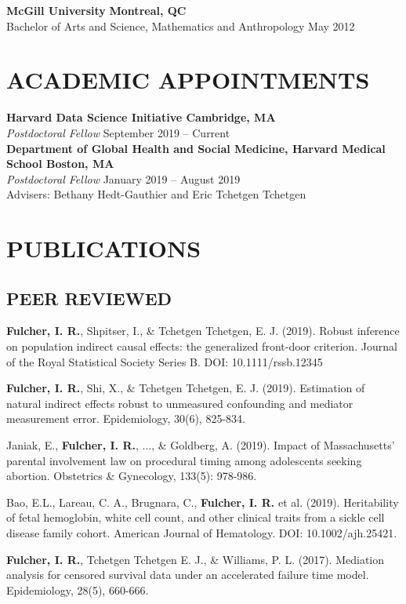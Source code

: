 \documentclass[12pt]{article}
\begin{document}
\textbf{McGill University} \hfill \hfill \textbf{Montreal, QC} \\
Bachelor of Arts and Science, Mathematics and Anthropology  \hfill \hfill May 2012 


\section*{\textbf{{\large A}CADEMIC {\large A}PPOINTMENTS }}

\textbf{Harvard Data Science Initiative \hfill \hfill Cambridge, MA} \\
\textit{Postdoctoral Fellow}  \hfill \hfill September 2019 -- Current \\

\textbf{Department of Global Health and Social Medicine, Harvard Medical School \hfill \hfill Boston, MA} \\
\textit{Postdoctoral Fellow} \hfill \hfill January 2019 -- August 2019 \\
Advisers: Bethany Hedt-Gauthier and Eric Tchetgen Tchetgen 

\section*{\textbf{{\large P}{UBLICATIONS}}}

\subsection*{\textbf{PEER REVIEWED}}

\begin{etaremune}
	\item \textbf{Fulcher, I. R.}, Shpitser, I., \& Tchetgen Tchetgen, E. J. (2019). Robust inference on population indirect causal effects: the generalized front-door criterion. Journal of the Royal Statistical Society Series B. DOI: 10.1111/rssb.12345
	
	\item \textbf{Fulcher, I. R.}, Shi, X., \& Tchetgen Tchetgen, E. J. (2019). Estimation of natural indirect effects robust to unmeasured confounding and mediator measurement error. Epidemiology, 30(6), 825-834.
	
	\item Janiak, E., \textbf{Fulcher, I. R.}, ..., \& Goldberg, A. (2019). Impact of Massachusetts' parental involvement law on procedural timing among adolescents seeking abortion. Obstetrics \& Gynecology, 133(5): 978-986.
	
	\item Bao, E.L., Lareau, C. A., Brugnara, C., \textbf{Fulcher, I. R.} et al. (2019). Heritability of fetal hemoglobin, white cell count, and other clinical traits from a sickle cell disease family cohort. American Journal of Hematology. DOI: 10.1002/ajh.25421. 
	
	\item \textbf{Fulcher, I. R.}, Tchetgen Tchetgen E. J., \& Williams, P. L. (2017). Mediation analysis for censored survival data under an accelerated failure time model.  Epidemiology, 28(5), 660-666. 
\end{etaremune}
\end{document}
